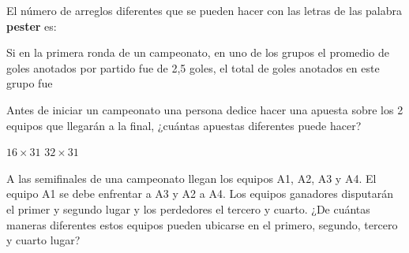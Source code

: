 \documentclass[10pt,letterpaper,addpoints]{exam}
\begin{document}
\begin{multicols}{2}
\begin{questions}
\begin{oneparchoices}
\end{oneparchoices}
\question El número de arreglos diferentes que se pueden hacer con las letras de las palabra \textbf{pester} es:

\begin{oneparchoices}
\end{oneparchoices}

\question \label{firstq3} Si en la primera ronda de un campeonato, en uno de los grupos el promedio de goles anotados por partido fue de 2,5 goles, el total de goles anotados en este grupo fue

\begin{oneparchoices}
\end{oneparchoices}
\question Antes de iniciar un campeonato una persona dedice hacer una apuesta sobre los 2 equipos que llegarán a la final, ¿cuántas apuestas diferentes puede hacer?

\begin{oneparchoices}
 \CorrectChoice $16\times 31$
 \choice $32\times 31$
\end{oneparchoices}
\question \label{lastq3} A las semifinales de una campeonato llegan los equipos A1, A2, A3 y A4. El equipo A1 se debe enfrentar a A3 y A2 a A4. Los equipos ganadores disputarán el primer y segundo lugar y los perdedores el tercero y cuarto. ¿De cuántas maneras diferentes estos equipos pueden ubicarse en el primero, segundo, tercero y cuarto lugar?

\begin{oneparchoices}
\end{oneparchoices}

\end{questions}
\end{multicols}
\end{document}
